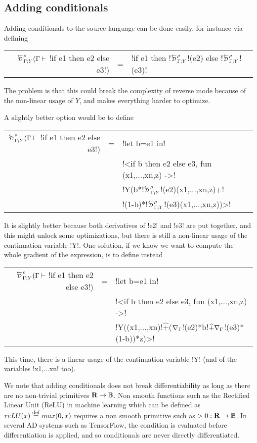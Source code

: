 \subsection{Adding conditionals} %
\label{sub:Adding conditionals}

Adding conditionals to the source language can be done easily, for instance via defining

\begin{tabular}{r c l}
$\directD{\rho}{\Gamma}{Y}(\Gamma \vdash$ !if e1 then e2 else e3!) &=& !if e1 then !$\directD{\rho}{\Gamma}{Y}$!(e2) else !$\directD{\rho}{\Gamma}{Y}$!(e3)! 
\end{tabular}

The problem is that this could break the complexity of reverse mode because of the non-linear usage of $Y$, and makes everything harder to optimize.

A slightly better option would be to define 

\begin{tabular}{r c l}
    $\directD{\rho}{\Gamma}{Y}(\Gamma \vdash$ !if e1 then e2 else e3!) 
    &=& !let b=e1 in!   \\
    && !<if b then e2 else e3, fun (x1,...,xn,z) ->! \\
    && !Y(b*!$\directD{\rho}{\Gamma}{Y}$!(e2)(x1,...,xn,z)+!\\
    && \quad!(1-b)*!$\directD{\rho}{\Gamma}{Y}$!(e3)(x1,...,xn,z))>!
\end{tabular}

It is slightly better because both derivatives of !e2! and !e3! are put together, and this might unlock some optimizations, 
but there is still a non-linear usage of the continuation variable !Y!.
One solution, if we know we want to compute the whole gradient of the expression, is to define instead

\begin{tabular}{r c l}
    $\directD{\rho}{\Gamma}{Y}(\Gamma \vdash$ !if e1 then e2 else e3!) 
    &=& !let b=e1 in!   \\
    && !<if b then e2 else e3, fun (x1,...,xn,z) ->! \\
    && !Y((x1,...,xn)!$\widehat{+}$($\nabla_\Gamma$!(e2)*b!$\widehat{+}\nabla_\Gamma$!(e3)*(1-b))*z)>!\\
\end{tabular}

This time, there is a linear usage of the continuation variable !Y! (and of the variables !x1,...xn! too).

We note that adding conditionals does not break differentiability as long as there are no non-trivial primitives $\mathbf{R}\to\mathbb{B}$.
Non smooth functions such as the Rectified Linear Unit (ReLU) in machine learning which can be defined as $reLU(x)\stackrel {\mathrm{def}}= max(0,x)$ 
requires a non smooth primitive such as $>0: \mathbf{R}\to\mathbb{B}$. In several AD systems such as TensorFlow, 
the condition is evaluated before differentiation is applied, and so conditionals are never directly differentiated.


